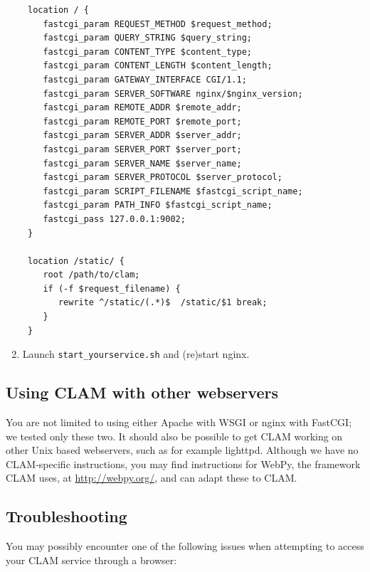 \documentclass[a4paper,12pt]{report}
\begin{document}
\begin{enumerate}
\begin{verbatim}
 location / {
    fastcgi_param REQUEST_METHOD $request_method;
    fastcgi_param QUERY_STRING $query_string;
    fastcgi_param CONTENT_TYPE $content_type;
    fastcgi_param CONTENT_LENGTH $content_length;
    fastcgi_param GATEWAY_INTERFACE CGI/1.1;
    fastcgi_param SERVER_SOFTWARE nginx/$nginx_version;
    fastcgi_param REMOTE_ADDR $remote_addr;
    fastcgi_param REMOTE_PORT $remote_port;
    fastcgi_param SERVER_ADDR $server_addr;
    fastcgi_param SERVER_PORT $server_port;
    fastcgi_param SERVER_NAME $server_name;
    fastcgi_param SERVER_PROTOCOL $server_protocol;
    fastcgi_param SCRIPT_FILENAME $fastcgi_script_name;
    fastcgi_param PATH_INFO $fastcgi_script_name;
    fastcgi_pass 127.0.0.1:9002;
 }

 location /static/ {
    root /path/to/clam;
    if (-f $request_filename) {
       rewrite ^/static/(.*)$  /static/$1 break;
    }
 }
\end{verbatim}
\item Launch \texttt{start\_yourservice.sh}  and (re)start nginx.
\end{enumerate}


\subsection{Using CLAM with other webservers}

You are not limited to using either Apache with WSGI or nginx with FastCGI; we
tested only these two. It should also be possible to get CLAM working on other
Unix based webservers, such as for example lighttpd. Although we have no
CLAM-specific instructions, you may find instructions for WebPy, the framework
CLAM uses, at \url{http://webpy.org/}, and can adapt these to CLAM.








\subsection{Troubleshooting}

You may possibly encounter one of the following issues when attempting to access your CLAM service through a browser:
\end{document}
